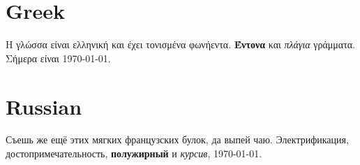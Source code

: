 \documentclass{article}
\begin{document}
\section{Greek}
\begin{greek}
Η γλώσσα είναι ελληνική και έχει τονισμένα φωνήεντα. \textbf{Έντονα} και
\textit{πλάγια} γράμματα. Σήμερα είναι \today.
\end{greek}
\section{Russian}
\begin{russian}
Съешь же ещё этих мягких французских булок, да выпей чаю. Электрификация,
достопримечательность, \textbf{полужирный} и \textit{курсив}, \today.
\end{russian}
\end{document}
